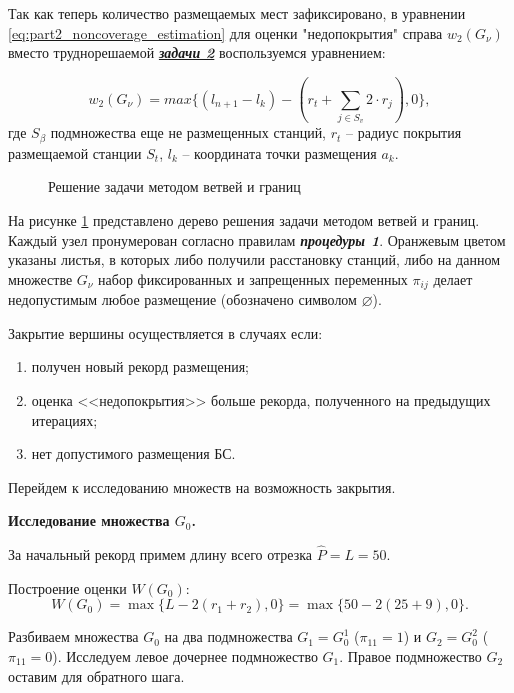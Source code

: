Так как теперь количество размещаемых мест зафиксировано, в уравнении \cref{eq:part2_noncoverage_estimation} для оценки "недопокрытия" справа $w_2 \left(G_\nu \right)$ вместо труднорешаемой \underline{\textit{\textbf{задачи 2}}} воспользуемся уравнением:

\begin{equation}\label{eq:part4_noncoverage_estimation2}
  w_2 \left(G_\nu \right) = max\{\left(l_{n+1}-l_k\right)-(r_t+\sum_{j\in S_v}{2 \cdot r_j}),0\},
\end{equation}
где $S_\beta$ подмножества еще не размещенных станций, $r_t$ -- радиус покрытия размещаемой станции $S_t$, $l_k$ -- координата точки размещения $a_k$.

\begin{figure}[ht]
  \caption{Решение задачи методом ветвей и границ}\label{fig:part2_branch_and_bound_tree}
\end{figure}


На рисунке \cref{fig:part2_branch_and_bound_tree} представлено дерево решения задачи методом ветвей и границ. Каждый узел пронумерован согласно правилам \textit{\textbf{процедуры 1}}. Оранжевым цветом указаны листья, в которых либо получили расстановку станций, либо на данном множестве $G_\nu$ набор фиксированных и запрещенных переменных $\pi_{ij}$ делает недопустимым любое размещение (обозначено символом $\varnothing$).

Закрытие вершины осуществляется в случаях если:
\begin{enumerate}
  \item получен новый рекорд размещения;
  \item оценка <<недопокрытия>> больше рекорда, полученного на предыдущих итерациях;
  \item нет допустимого размещения БС.
\end{enumerate} 
Перейдем к исследованию множеств на возможность закрытия.

\textbf{Исследование множества $G_0$.}

За начальный рекорд примем длину всего отрезка $\widehat{P} = L = 50$.

Построение оценки $W(G_0)$:
$$
W(G_0)= \max\{L-2(r_1 + r_2), 0\} = \max\{50 -2(25+9), 0 \}.
$$

Разбиваем множества $G_0$ на два подмножества $G_1 = G^1_0$ ($\pi_{11} = 1$) и $G_2 = G^2_0$ ($\pi_{11} = 0$). Исследуем левое дочернее подмножество $G_1$. Правое подмножество $G_2$ оставим для обратного шага.

